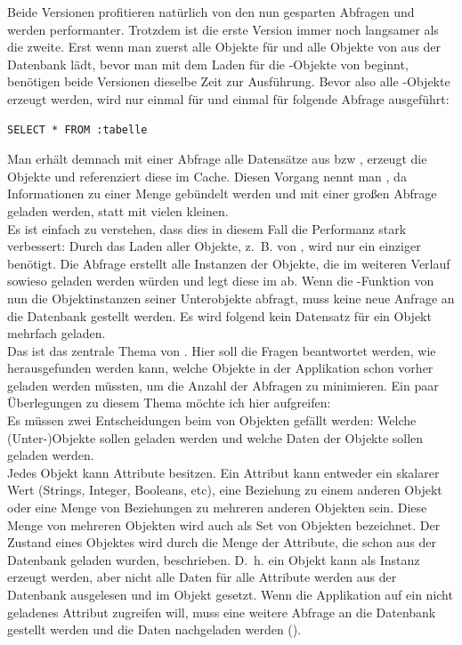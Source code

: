Beide Versionen profitieren natürlich von den nun gesparten Abfragen und werden performanter. Trotzdem ist die erste Version immer noch langsamer als die zweite. Erst wenn man zuerst alle Objekte für  und alle Objekte von  aus der Datenbank lädt, bevor man mit dem Laden für die -Objekte von  beginnt, benötigen beide Versionen dieselbe Zeit zur Ausführung. Bevor also alle -Objekte erzeugt werden, wird nur einmal für  und einmal für  folgende Abfrage ausgeführt: 
\lstset{style=SQL}
\begin{lstlisting}
SELECT * FROM :tabelle
\end{lstlisting}
Man erhält demnach mit einer Abfrage alle Datensätze aus  bzw , erzeugt die Objekte und referenziert diese im Cache. Diesen Vorgang nennt man , da Informationen zu einer Menge gebündelt werden und mit einer großen Abfrage geladen werden, statt mit vielen kleinen. \\
Es ist einfach zu verstehen, dass dies in diesem Fall die Performanz stark verbessert: Durch das Laden aller Objekte, z.~B. von , wird nur ein einziger  benötigt. Die Abfrage erstellt alle Instanzen der Objekte, die im weiteren Verlauf sowieso geladen werden würden und legt diese im \objectcache ab. Wenn die -Funktion von  nun die Objektinstanzen seiner Unterobjekte abfragt, muss keine neue Anfrage an die Datenbank gestellt werden. Es wird folgend kein Datensatz für ein Objekt mehrfach geladen. \\
Das  ist das zentrale Thema von \cite{Bernstein99context-basedprefetch}. Hier soll die Fragen beantwortet werden, wie herausgefunden werden kann, welche Objekte in der Applikation schon vorher geladen werden müssten, um die Anzahl der Abfragen zu minimieren. Ein paar Überlegungen zu diesem Thema möchte ich hier aufgreifen: \\
Es müssen zwei Entscheidungen beim  von Objekten gefällt werden: Welche (Unter-)Objekte sollen geladen werden und welche Daten der Objekte sollen geladen werden. \\
Jedes Objekt kann Attribute besitzen. Ein Attribut kann entweder ein skalarer Wert (Strings, Integer, Booleans, etc), eine Beziehung zu einem anderen Objekt oder eine Menge von Beziehungen zu mehreren anderen Objekten sein. Diese Menge von mehreren Objekten wird auch als Set von Objekten bezeichnet. Der Zustand eines Objektes wird durch die Menge der Attribute, die schon aus der Datenbank geladen wurden, beschrieben. D.~h. ein Objekt kann als Instanz erzeugt werden, aber nicht alle Daten für alle Attribute werden aus der Datenbank ausgelesen und im Objekt gesetzt. Wenn die Applikation auf ein nicht geladenes Attribut zugreifen will, muss eine weitere Abfrage an die Datenbank gestellt werden und die Daten nachgeladen werden (). \\
